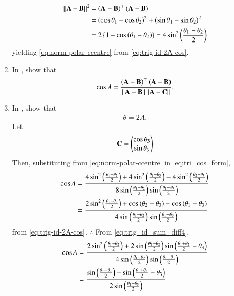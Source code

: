 \begin{enumerate}[label=\thesubsection.\arabic*.,ref=\thesubsection.\theenumi]
\begin{align}
	  \left\lVert\mathbf{A}-\mathbf{B}\right\rVert^2 &= 
	  \left(\mathbf{A}-\mathbf{B}\right)^\top
	  \left(\mathbf{A}-\mathbf{B}\right) 
	  \\
	  &= 
	  \left(\cos \theta_1-\cos \theta_2\right)^2 +\left(\sin \theta_1-\sin \theta_2\right)^2
	  \\
	  &= 2\left\{1-
	  \cos \left(\theta_1-\theta_2\right)\right\} = 4 \sin^2 \left(\frac{\theta_1-\theta_2}{2}\right)
  \end{align}
  yielding 
\eqref{eq:norm-polar-ccentre} from
\eqref{eq:trig-id-2A-cos}.
  \item In 
	, show that 
\begin{align}
	\cos A = \frac{
	  \left(\mathbf{A}-\mathbf{B}\right)^\top
	  \left(\mathbf{A}-\mathbf{B}\right) 
}
{
	  \left\lVert\mathbf{A}-\mathbf{B}\right\rVert
	  \left\lVert\mathbf{A}-\mathbf{C}\right\rVert
}
\label{eq:tri_cos_form-ccentre-norm},
\end{align}
  \item In 
	,
show that 
  \begin{align}
	  \theta = 2A
\label{eq:ang-subtend-ccentre}.
  \end{align}
  \solution Let 
  \begin{align}
	  \mathbf{C} = \begin{pmatrix}\cos \theta_3 \\ \sin \theta_3\end{pmatrix}
  \end{align}
  Then, 
  substituting 
  from 
\eqref{eq:norm-polar-ccentre}
in 
\eqref{eq:tri_cos_form},
  \begin{align}
	  \cos A &= \frac{4 \sin^2 \left(\frac{\theta_1-\theta_2}{2}\right) +4\sin^2 \left(\frac{\theta_1-\theta_3}{2}\right)-4 \sin^2 \left(\frac{\theta_2-\theta_3}{2}\right)}{8 \sin \left(\frac{\theta_1-\theta_2}{2}\right) \sin \left(\frac{\theta_1-\theta_3}{2}\right)}
	  \\
	   &= \frac{2 \sin^2 \left(\frac{\theta_1-\theta_2}{2}\right) +\cos \left({\theta_2-\theta_3}\right)- \cos \left({\theta_1-\theta_3}\right)}{4 \sin \left(\frac{\theta_1-\theta_2}{2}\right) \sin \left(\frac{\theta_1-\theta_3}{2}\right)}
  \end{align}
  from 
\eqref{eq:trig-id-2A-cos}. $\therefore$ From 
\eqref{eq:trig_id_sum_diff4},
  \begin{align}
	   \cos A &= \frac{2 \sin^2 \brak{\frac{\theta_1-\theta_2}{2}} +2\sin \brak{\frac{\theta_1-\theta_2}{2}}\sin \brak{\frac{\theta_1+\theta_2}{2}-\theta_3}}{4 \sin \brak{\frac{\theta_1-\theta_2}{2}} \sin \brak{\frac{\theta_1-\theta_3}{2}}}
	  \\
	   &= \frac{ \sin \brak{\frac{\theta_1-\theta_2}{2}} +\sin \brak{\frac{\theta_1+\theta_2}{2}-\theta_3}}{ 2\sin\brak{\frac{\theta_1-\theta_3}{2}}}

\end{align}
\end{enumerate}
